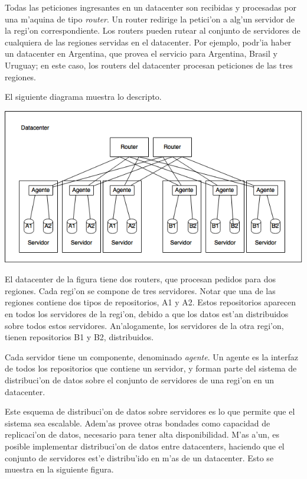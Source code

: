 Todas las peticiones ingresantes en un datacenter son recibidas y procesadas por una m'aquina de tipo \textit{router}. Un router redirige la petici'on a alg'un servidor de la regi'on correspondiente. Los routers pueden rutear al conjunto de servidores de cualquiera de las regiones servidas en el datacenter. Por ejemplo, podr'ia haber un datacenter en Argentina, que provea el servicio para Argentina, Brasil y Uruguay; en este caso, los routers del datacenter procesan peticiones de las tres regiones.

El siguiente diagrama muestra lo descripto.

\includegraphics[width=15cm]{diagramas/datacenter.png}

\noindent
El datacenter de la figura tiene dos routers, que procesan pedidos para dos regiones. Cada regi'on se compone de tres servidores. Notar que una de las regiones contiene dos tipos de repositorios, A1 y A2. Estos repositorios aparecen en todos los servidores de la regi'on, debido a que los datos est'an distribuidos sobre todos estos servidores. An'alogamente, los servidores de la otra regi'on, tienen repositorios B1 y B2, distribuidos.

Cada servidor tiene un componente, denominado \textit{agente}. Un agente es la interfaz de todos los repositorios que contiene un servidor, y forman parte del sistema de distribuci'on de datos sobre el conjunto de servidores de una regi'on en un datacenter.

Este esquema de distribuci'on de datos sobre servidores es lo que permite que el sistema sea escalable. Adem'as provee otras bondades como capacidad de replicaci'on de datos, necesario para tener alta disponibilidad. M'as a'un, es posible implementar distribuci'on de datos entre datacenters, haciendo que el conjunto de servidores est'e distribu'ido en m'as de un datacenter. Esto se muestra en la siguiente figura.

